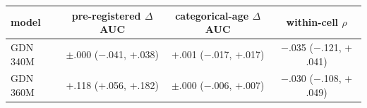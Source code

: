 \begin{tabular}{lccc}
\toprule
model & pre-registered $\Delta$AUC & categorical-age $\Delta$AUC & within-cell $\rho$ \\
\midrule
GDN 340M & $\pm$.000 ($-$.041, $+$.038) & $+$.001 ($-$.017, $+$.017) & $-$.035 ($-$.121, $+$.041) \\
GDN 360M & $+$.118 ($+$.056, $+$.182) & $\pm$.000 ($-$.006, $+$.007) & $-$.030 ($-$.108, $+$.049) \\
\bottomrule
\end{tabular}
